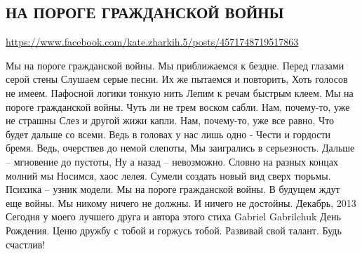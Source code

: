  
 
 
 
 

\subsection{НА ПОРОГЕ ГРАЖДАНСКОЙ ВОЙНЫ}
\url{https://www.facebook.com/kate.zharkih.5/posts/4571748719517863}

Мы на пороге гражданской войны.
Мы приближаемся к бездне.
Перед глазами серой стены 
Слушаем серые песни.
Их же пытаемся и повторить,
Хоть голосов не имеем.
Пафосной логики тонкую нить
Лепим к речам быстрым клеем.
Мы на пороге гражданской войны.
Чуть ли не трем воском сабли.
Нам, почему-то, уже не страшны
Слез и другой жижи капли.
Нам, почему-то, уже все равно,
Что будет дальше со всеми.
Ведь в головах у нас лишь одно - 
Чести и гордости бремя.
Ведь, очерствев до немой слепоты,
Мы заигрались в серьезность.
Дальше – мгновение до пустоты,
Ну а назад – невозможно.
Словно на разных концах молний мы
Носимся, хаос лелея.
Сумели создать новый вид сверх тюрьмы.
Психика – узник модели.
Мы на пороге гражданской войны.
В будущем ждут еще войны.
Мы никому ничего не должны.
И ничего не достойны.
Декабрь, 2013
Сегодня у моего лучшего друга и автора этого стиха Gabriel Gabrilchuk
 День Рождения. Ценю дружбу с тобой и горжусь тобой. Развивай свой талант. Будь счастлив!
